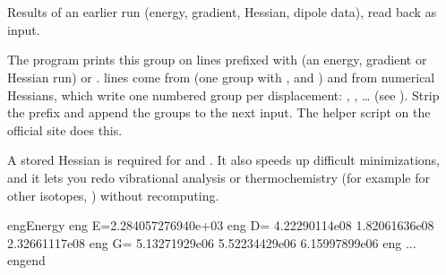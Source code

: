 \documentclass[letterpaper,10pt,english,openany,oneside]{sphinxmanual}
\begin{document}
\sphinxAtStartPar
{}

\begin{sphinxVerbatim}[commandchars=\\\{\}]
\end{sphinxVerbatim}

\sphinxstepscope




\section{}
\label{\detokenize{reference/Energy:energy}}\label{\detokenize{reference/Energy:group-energy}}\label{\detokenize{reference/Energy::doc}}
\ignorespaces 
\sphinxAtStartPar
Results of an earlier run (energy, gradient, Hessian, dipole data), read back as input.

\sphinxAtStartPar
The program prints this group on lines prefixed with  (an energy, gradient or Hessian run) or .
 lines come from  (one  group with ,  and ) and from numerical Hessians,
which write one numbered group per displacement: , , … (see ). Strip the
prefix and append the groups to the next input. The helper script  on the official site does this.

\sphinxAtStartPar
A stored Hessian is required for  and . It also speeds up difficult minimizations,
and it lets you redo vibrational analysis or thermochemistry (for example for other isotopes, )
without recomputing.

\begin{sphinxVerbatim}[commandchars=\\\{\}]
eng\PYGZgt{}\PYGZdl{}Energy
eng\PYGZgt{} E=\PYGZhy{}2.284057276940e+03
eng\PYGZgt{} D= 4.22290114e\PYGZhy{}08 \PYGZhy{}1.82061636e\PYGZhy{}08  2.32661117e\PYGZhy{}08
eng\PYGZgt{} G= 5.13271929e\PYGZhy{}06 \PYGZhy{}5.52234429e\PYGZhy{}06 \PYGZhy{}6.15997899e\PYGZhy{}06
eng\PYGZgt{}    ...
eng\PYGZgt{}\PYGZdl{}end
\end{sphinxVerbatim}
\end{document}
